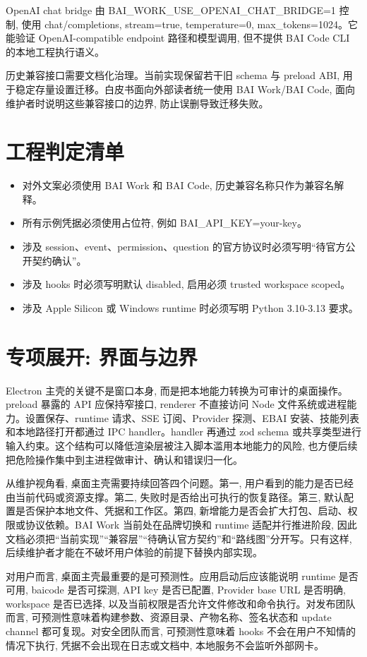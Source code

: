 OpenAI chat bridge 由 BAI\_WORK\_USE\_OPENAI\_CHAT\_BRIDGE=1 控制, 使用 chat/completions, stream=true, temperature=0, max\_tokens=1024。它能验证 OpenAI-compatible endpoint 路径和模型调用, 但不提供 BAI Code CLI 的本地工程执行语义。

历史兼容接口需要文档化治理。当前实现保留若干旧 schema 与 preload ABI, 用于稳定存量设置迁移。白皮书面向外部读者统一使用 BAI Work/BAI Code, 面向维护者时说明这些兼容接口的边界, 防止误删导致迁移失败。

\section{工程判定清单}
\begin{itemize}
  \item 对外文案必须使用 BAI Work 和 BAI Code, 历史兼容名称只作为兼容名解释。
  \item 所有示例凭据必须使用占位符, 例如 BAI\_API\_KEY=your-key。
  \item 涉及 session、event、permission、question 的官方协议时必须写明“待官方公开契约确认”。
  \item 涉及 hooks 时必须写明默认 disabled, 启用必须 trusted workspace scoped。
  \item 涉及 Apple Silicon 或 Windows runtime 时必须写明 Python 3.10-3.13 要求。
\end{itemize}

\section{专项展开: 界面与边界}
Electron 主壳的关键不是窗口本身, 而是把本地能力转换为可审计的桌面操作。preload 暴露的 API 应保持窄接口, renderer 不直接访问 Node 文件系统或进程能力。设置保存、runtime 请求、SSE 订阅、Provider 探测、EBAI 安装、技能列表和本地路径打开都通过 IPC handler。handler 再通过 zod schema 或共享类型进行输入约束。这个结构可以降低渲染层被注入脚本滥用本地能力的风险, 也方便后续把危险操作集中到主进程做审计、确认和错误归一化。

从维护视角看, 桌面主壳需要持续回答四个问题。第一, 用户看到的能力是否已经由当前代码或资源支撑。第二, 失败时是否给出可执行的恢复路径。第三, 默认配置是否保护本地文件、凭据和工作区。第四, 新增能力是否会扩大打包、启动、权限或协议依赖。BAI Work 当前处在品牌切换和 runtime 适配并行推进阶段, 因此文档必须把“当前实现”“兼容层”“待确认官方契约”和“路线图”分开写。只有这样, 后续维护者才能在不破坏用户体验的前提下替换内部实现。

对用户而言, 桌面主壳最重要的是可预测性。应用启动后应该能说明 runtime 是否可用, baicode 是否可探测, API key 是否已配置, Provider base URL 是否明确, workspace 是否已选择, 以及当前权限是否允许文件修改和命令执行。对发布团队而言, 可预测性意味着构建参数、资源目录、产物名称、签名状态和 update channel 都可复现。对安全团队而言, 可预测性意味着 hooks 不会在用户不知情的情况下执行, 凭据不会出现在日志或文档中, 本地服务不会监听外部网卡。

